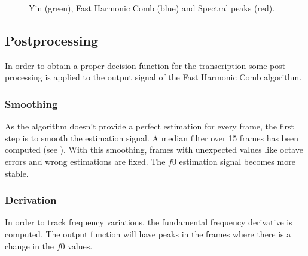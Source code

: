 \documentclass{article}
\begin{document}
\begin{figure}
 \centerline{}
 \caption{Yin (green), Fast Harmonic Comb (blue) and Spectral peaks (red).}
 \label{fig:yinvsfhc}
\end{figure}

\subsection{Postprocessing}\label{subsec:f0_postpro}
In order to obtain a proper decision function for the transcription some post processing is applied to the output signal of the Fast Harmonic Comb algorithm. 

\subsubsection{Smoothing}
As the algorithm doesn't provide a perfect estimation for every frame, the first step is to smooth the estimation signal. A median filter over 15 frames has been computed (see ). With this smoothing, frames with unexpected values like octave errors and wrong estimations are fixed. The ${f0}$ estimation signal becomes more stable.

\subsubsection{Derivation}
In order to track frequency variations, the fundamental frequency derivative is computed. The output function will have peaks in the frames where there is a change in the ${f0}$ values.
\end{document}
